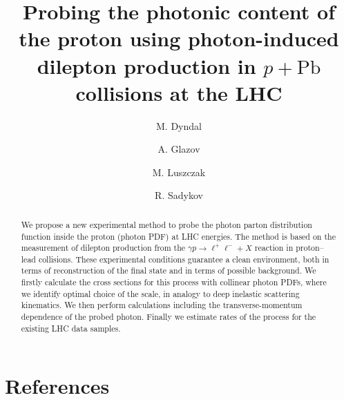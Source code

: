 \documentclass[preprint,12pt]{revtex4}
\begin{document}
\title{Probing the photonic content of the proton using photon-induced dilepton production in $p+\textrm{Pb}$ collisions at the LHC}


\author{M. Dyndal}
\address{Deutsches Elektronen-Synchrotron DESY, Hamburg, Germany}

\author{A. Glazov}
\address{Deutsches Elektronen-Synchrotron DESY, Hamburg, Germany}

\author{M. Luszczak}
\address{Faculty of Mathematics and Natural Sciences, University of Rzeszow, Poland}
\author{R. Sadykov}
\address{Joint Institute for Nuclear Research (JINR), Dubna, Russia}



\begin{abstract}
We propose a new experimental method to probe the photon parton distribution function inside the proton (photon PDF) at LHC energies.
The method is based on the measurement of dilepton production from the $\gamma p\rightarrow\ell^+\ell^-+X$ reaction in proton--lead collisions. These experimental conditions guarantee a clean environment, both in terms of reconstruction of the final state and in terms of possible background.
We firstly calculate the cross sections for this process with collinear photon PDFs, where we identify optimal choice of the scale, in analogy to deep inelastic scattering kinematics.
We then perform calculations including the transverse-momentum dependence of the probed photon.
Finally we estimate rates of the process for the existing LHC data samples.
\end{abstract}




\maketitle










\FloatBarrier




\section*{References}


\end{document}
